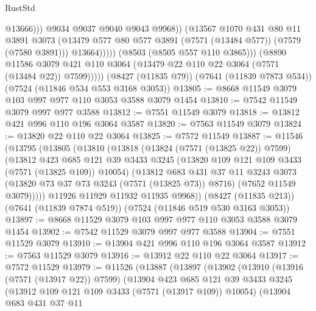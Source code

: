 \begin{lexlean}{RustStd}
\begin{coremodule}
{\begin{coremodule}
{{{{{{{{{{{{{{{{{{{{{{{{{{{{{{{{                              @13666)))
                        @9034
                        @9037
                        @9040
                        @9043
                        @9968))
                    (@13567
                      @1070
                      @431
                      @80
                      @11
                      @3891
                      @3073
                      (@13479 @577 @80 @577 @3891 (@7571 (@13484 @577)) (@7579 (@7580 @3891)))
                      @13664)))))
            (@8503 (@8505 @557 @110 @3865)))
          (@8890
            @11586
            @3079
            @421
            @110
            @3064
            (@13479 @22 @110 @22 @3064 (@7571 (@13484 @22)) @7599)))))
    (@8427 (@11835 @79))
    (@7641 (@11839 @7873 @534))
    (@7524 (@11846 @534 @553 @3168 @3053))
@13805 := @8668 @11549 @3079 @103 @997 @977 @110 @3053 @3588 @3079 @1454
@13810 := @7542 @11549 @3079 @997 @977 @3588
@13812 := @7551 @11549 @3079
@13818 := @13812 @421 @996 @110 @196 @3064 @3587
@13820 := @7563 @11549 @3079
@13824 := @13820 @22 @110 @22 @3064
@13825 := @7572 @11549
@13887 := @11546
    (@13795
      (@13805
        (@13810
          (@13818
            (@13824 (@7571 (@13825 @22)) @7599)
            (@13812
              @423
              @685
              @121
              @39
              @3433
              @3245
              (@13820 @109 @121 @109 @3433 (@7571 (@13825 @109)) @10054)
              (@13812
                @683
                @431
                @37
                @11
                @3243
                @3073
                (@13820 @73 @37 @73 @3243 (@7571 (@13825 @73)) @8716)
                (@7652 @11549 @3079)))))
        @11926
        @11929
        @11932
        @11935
        @9968))
    (@8427 (@11835 @213))
    (@7641 (@11839 @7874 @519))
    (@7524 (@11846 @519 @530 @3163 @3053))
@13897 := @8668 @11529 @3079 @103 @997 @977 @110 @3053 @3588 @3079 @1454
@13902 := @7542 @11529 @3079 @997 @977 @3588
@13904 := @7551 @11529 @3079
@13910 := @13904 @421 @996 @110 @196 @3064 @3587
@13912 := @7563 @11529 @3079
@13916 := @13912 @22 @110 @22 @3064
@13917 := @7572 @11529
@13979 := @11526
    (@13887
      (@13897
        (@13902
          (@13910
            (@13916 (@7571 (@13917 @22)) @7599)
            (@13904
              @423
              @685
              @121
              @39
              @3433
              @3245
              (@13912 @109 @121 @109 @3433 (@7571 (@13917 @109)) @10054)
              (@13904
                @683
                @431
                @37
                @11
}}}}}}}}}}}}}}}}}}}}}}}}}}}}}}}}
\end{coremodule}}
\end{coremodule}
\end{lexlean}
